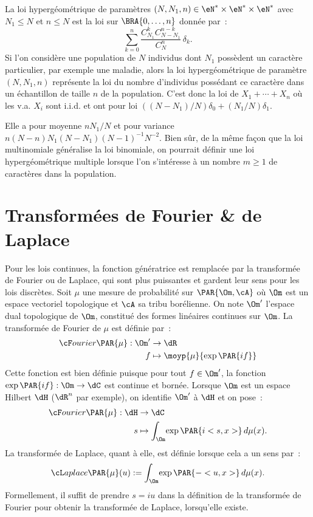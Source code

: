 La loi hypergéométrique de paramètres $(N,N_1,n)\in\eN^*\times\eN^*\times\eN^*$
avec $N_1\leq N$ et $n\leq N$ est la loi sur $\BRA{0,\ldots,n}$ donnée par~:
$$
\sum_{k=0}^n \frac{C_{N_1}^kC_{N-N_1}^{n-k}}{C_N^n}\,\delta_k.
$$
Si l'on considère une population de $N$ individus dont $N_1$ possèdent un
caractère particulier, par exemple une maladie, alors la loi hypergéométrique
de paramètre $(N,N_1,n)$ représente la loi du nombre d'individus possédant ce
caractère dans un échantillon de taille $n$ de la population. C'est donc la
loi de $X_1+\cdots+X_n$ où les v.a. $X_i$ sont i.i.d. et ont pour loi
$((N-N_1)/N)\delta_0+(N_1/N)\delta_1$.

Elle a pour moyenne $nN_1/N$ et pour variance
$n(N-n)N_1(N-N_1)(N-1)^{-1}N^{-2}$. Bien sûr, de la même façon que 
la loi multinomiale généralise la loi binomiale, on pourrait définir une
loi hypergéométrique multiple lorsque l'on s'intéresse à un nombre $m\geq 1$ de
caractères dans la population.


%
\section{Transformées de Fourier \& de Laplace}
%

Pour les lois continues, la fonction génératrice est remplacée par la
transformée de Fourier ou de Laplace, qui sont plus puissantes et gardent leur
sens pour les lois discrètes. Soit $\mu$ une mesure de probabilité sur
$\PAR{\Om,\cA}$ où $\Om$ est un espace vectoriel topologique et $\cA$ sa tribu
borélienne. On note $\Om'$ l'espace dual topologique de $\Om$, constitué des
formes linéaires continues sur $\Om$. La transformée de Fourier de $\mu$ est
définie par~:
\begin{align*}
  {\cF}ourier\PAR{\mu}:\Om' & \to\dR \\ f & \mapsto\moyp{\mu}{\exp\PAR{if}}
\end{align*}
Cette fonction est bien définie puisque pour tout $f\in\Om'$, la fonction
$\exp\PAR{if}:\Om\to\dC$ est continue et bornée. Lorsque $\Om$ est un espace
Hilbert $\dH$ ($\dR^n$ par exemple), on identifie $\Om'$ à $\dH$ et on pose~:
\begin{align*}
  {\cF}ourier\PAR{\mu}:\dH & \to\dC \\ s & \mapsto\int_\Om\!\exp\PAR{i<s,x>}\,d\mu(x).
\end{align*}
La transformée de Laplace, quant à elle, est définie lorsque cela a un sens
par~:
$$
{\cL}aplace\PAR{\mu}(u):=\int_\Om\!\exp\PAR{-<u,x>}\,d\mu(x).
$$
Formellement, il suffit de prendre $s=iu$ dans la définition de la transformée
de Fourier pour obtenir la transformée de Laplace, lorsqu'elle existe.

